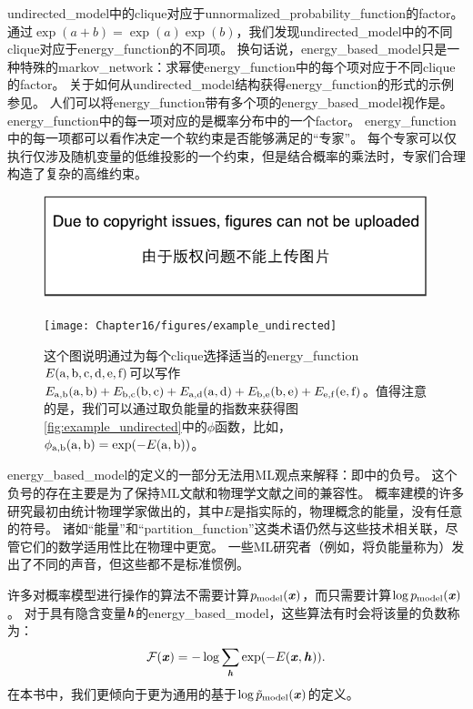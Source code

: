 \gls{undirected_model}中的\gls{clique}对应于\gls{unnormalized_probability_function}的\gls{factor}。 
通过$\exp(a+b) = \exp(a) \exp(b)$，我们发现\gls{undirected_model}中的不同\gls{clique}对应于\gls{energy_function}的不同项。
换句话说，\gls{energy_based_model}只是一种特殊的\gls{markov_network}：求幂使\gls{energy_function}中的每个项对应于不同\gls{clique}的\gls{factor}。
关于如何从\gls{undirected_model}结构获得\gls{energy_function}的形式的示例参见。
人们可以将\gls{energy_function}带有多个项的\gls{energy_based_model}视作是\citep{Hinton99}。
\gls{energy_function}中的每一项对应的是概率分布中的一个\gls{factor}。
\gls{energy_function}中的每一项都可以看作决定一个软约束是否能够满足的``专家''。
每个专家可以仅执行仅涉及随机变量的低维投影的一个约束，但是结合概率的乘法时，专家们合理构造了复杂的高维约束。
\begin{figure}[!htb]
\ifOpenSource
\centerline{\includegraphics{figure.pdf}}
\else
	\centerline{\texttt{[image: Chapter16/figures/example\_undirected]}}
\fi
	\caption{这个图说明通过为每个\gls{clique}选择适当的\gls{energy_function}$E(\mathrm{a},\mathrm{b},\mathrm{c},\mathrm{d},\mathrm{e},\mathrm{f})$可以写作$E_{\mathrm{a},\mathrm{b}}(\mathrm{a},\mathrm{b}) + E_{\mathrm{b},\mathrm{c}}(\mathrm{b},\mathrm{c}) + E_{\mathrm{a},\mathrm{d}}(\mathrm{a},\mathrm{d})+  E_{\mathrm{b},\mathrm{e}}(\mathrm{b},\mathrm{e}) + E_{\mathrm{e},\mathrm{f}}(\mathrm{e},\mathrm{f})$。值得注意的是，我们可以通过取负能量的指数来获得图\ref{fig:example_undirected}中的$\phi$函数，比如，$\phi_{\mathrm{a},\mathrm{b}}(\mathrm{a},\mathrm{b}) = \exp(-E(\mathrm{a},\mathrm{b}))$。}
	\label{fig:example_undirected_2}
\end{figure}



\gls{energy_based_model}的定义的一部分无法用\gls{ML}观点来解释：即中的负号。
这个负号的存在主要是为了保持\gls{ML}文献和物理学文献之间的兼容性。
概率建模的许多研究最初由统计物理学家做出的，其中$E$是指实际的，物理概念的能量，没有任意的符号。
诸如``能量''和``\gls{partition_function}''这类术语仍然与这些技术相关联，尽管它们的数学适用性比在物理中更宽。
一些\gls{ML}研究者（例如，\citep{Smolensky86}将负能量称为）发出了不同的声音，但这些都不是标准惯例。


许多对概率模型进行操作的算法不需要计算$p_{\text{model}}(\boldsymbol{\mathit{x}})$，而只需要计算$\log p_{\text{model}}(\boldsymbol{\mathit{x}})$。
对于具有隐含变量$\boldsymbol{\mathit{h}}$的\gls{energy_based_model}，这些算法有时会将该量的负数称为：
\begin{align}
\label{eqn:168}
\mathcal{F} (\boldsymbol{\mathit{x}}) = -\log \sum_{\boldsymbol{\mathit{h}}} \exp(-E(\boldsymbol{\mathit{x}},\boldsymbol{\mathit{h}})).
\end{align}
在本书中，我们更倾向于更为通用的基于$\log \tilde{p}_{\text{model}}(\boldsymbol{\mathit{x}})$的定义。


